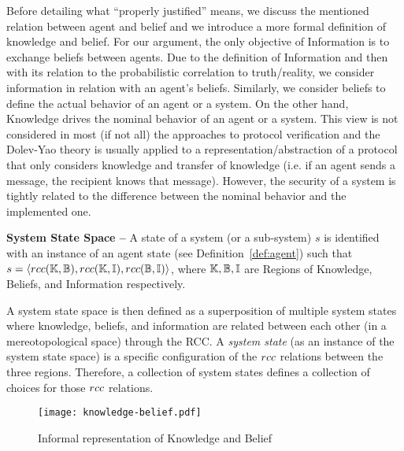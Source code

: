 Before detailing what ``properly justified'' means, we discuss the mentioned
relation between agent and belief and we introduce a more formal definition
of knowledge and belief. For our argument, the only objective of
Information is to exchange beliefs between agents.
Due to the definition of Information and then with its relation to the probabilistic
correlation to truth/reality, we consider
information in relation with an agent's beliefs. Similarly, we consider
beliefs to define the actual behavior of an agent or a system. On the other hand,
Knowledge drives the nominal behavior of an agent or a system. This view
is not considered in most (if not all) the approaches to protocol verification
and the Dolev-Yao theory is usually applied to a representation/abstraction
of a protocol that only considers knowledge and transfer of knowledge (i.e.
if an agent sends a message, the recipient knows that message). However,
the security of a system is tightly related to the difference between
the nominal behavior and the implemented one.

\begin{definition}{\bf System State Space --}\label{def:system}
	A state of a system (or a sub-system) $s$ is identified with 
	an instance of an agent state (see Definition~\ref{def:agent})
	such that
	$s=\langle rcc(\mathbb{K},\mathbb{B}),rcc(\mathbb{K},\mathbb{I}),rcc(\mathbb{B},\mathbb{I})\rangle$,
	where $\mathbb{K},\mathbb{B},\mathbb{I}$ are Regions of Knowledge, Beliefs, and Information respectively.
\end{definition}
A system state space is then defined as a superposition of multiple system states where knowledge,
beliefs, and information are related between each other (in a mereotopological
space) through the RCC. A \emph{system state} (as an instance of the system state space)
is a specific configuration of
the $rcc$ relations between the three regions. Therefore, a collection of 
system states defines a collection of choices for those $rcc$ relations.


\begin{figure}[t]
	\centering
	\texttt{[image: knowledge-belief.pdf]}
	\caption{Informal representation of Knowledge and Belief}
	\label{fig:knowledge-belief}
\end{figure}

